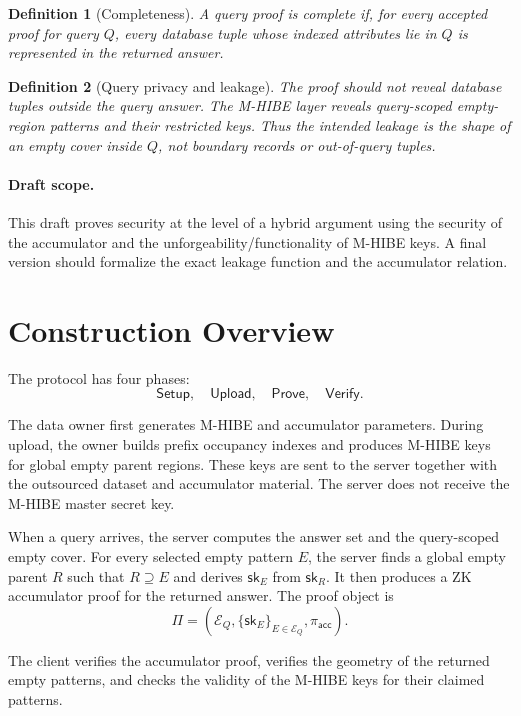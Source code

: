 \documentclass[11pt]{article}
\newtheorem{definition}{Definition}
\newcommand{\Setup}{\mathsf{Setup}}
\newcommand{\Upload}{\mathsf{Upload}}
\newcommand{\Prove}{\mathsf{Prove}}
\newcommand{\Verify}{\mathsf{Verify}}
\newcommand{\sk}{\mathsf{sk}}
\begin{document}
\begin{definition}[Completeness]
A query proof is complete if, for every accepted proof for query $Q$, every database tuple whose indexed attributes lie in $Q$ is represented in the returned answer.
\end{definition}

\begin{definition}[Query privacy and leakage]
The proof should not reveal database tuples outside the query answer. The M-HIBE layer reveals query-scoped empty-region patterns and their restricted keys. Thus the intended leakage is the shape of an empty cover inside $Q$, not boundary records or out-of-query tuples.
\end{definition}

\paragraph{Draft scope.}
This draft proves security at the level of a hybrid argument using the security of the accumulator and the unforgeability/functionality of M-HIBE keys. A final version should formalize the exact leakage function and the accumulator relation.

\section{Construction Overview}

The protocol has four phases:
\[
  \Setup,\quad \Upload,\quad \Prove,\quad \Verify.
\]

The data owner first generates M-HIBE and accumulator parameters. During upload, the owner builds prefix occupancy indexes and produces M-HIBE keys for global empty parent regions. These keys are sent to the server together with the outsourced dataset and accumulator material. The server does not receive the M-HIBE master secret key.

When a query arrives, the server computes the answer set and the query-scoped empty cover. For every selected empty pattern $E$, the server finds a global empty parent $R$ such that $R \supseteq E$ and derives $\sk_E$ from $\sk_R$. It then produces a ZK accumulator proof for the returned answer. The proof object is
\[
  \Pi =
  \left(
    \mathcal{E}_Q,
    \{\sk_E\}_{E\in\mathcal{E}_Q},
    \pi_{\mathsf{acc}}
  \right).
\]

The client verifies the accumulator proof, verifies the geometry of the returned empty patterns, and checks the validity of the M-HIBE keys for their claimed patterns.
\end{document}
